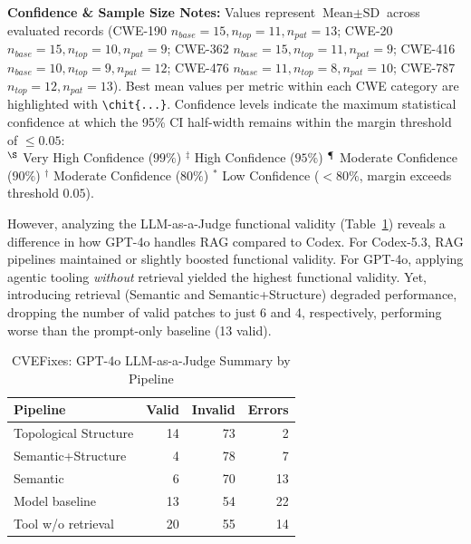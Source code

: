\begin{table}[H]
  \vspace{0.5em}
  \begin{minipage}{\linewidth}
    \small
    \textbf{Confidence \& Sample Size Notes:} Values represent $\text{Mean} \pm \text{SD}$ across evaluated records (CWE-190 $n_{base}=15, n_{top}=11, n_{pat}=13$; CWE-20 $n_{base}=15, n_{top}=10, n_{pat}=9$; CWE-362 $n_{base}=15, n_{top}=11, n_{pat}=9$; CWE-416 $n_{base}=10, n_{top}=9, n_{pat}=12$; CWE-476 $n_{base}=11, n_{top}=8, n_{pat}=10$; CWE-787 $n_{top}=12, n_{pat}=13$). Best mean values per metric within each CWE category are highlighted with \texttt{\textbackslash chit\{...\}}. Confidence levels indicate the maximum statistical confidence at which the 95\% CI half-width remains within the margin threshold of $\le 0.05$: \\
    \quad $^{\S}$ Very High Confidence ($99\%$) \quad $^{\ddagger}$ High Confidence ($95\%$) \quad $^{\mathparagraph}$ Moderate Confidence ($90\%$) \quad $^\dagger$ Moderate Confidence ($80\%$) \quad $^*$ Low Confidence ($<80\%$, margin exceeds threshold $0.05$).
  \end{minipage}
\end{table}

However, analyzing the LLM-as-a-Judge functional validity (Table~\ref{tab:llmjudge_gpt4o}) reveals a difference in how GPT-4o handles RAG compared to Codex. For Codex-5.3, RAG pipelines maintained or slightly boosted functional validity. For GPT-4o, applying agentic tooling \textit{without} retrieval yielded the highest functional validity. Yet, introducing retrieval (Semantic and Semantic+Structure) degraded performance, dropping the number of valid patches to just 6 and 4, respectively, performing worse than the prompt-only baseline (13 valid).

\begin{table}[H]
  \centering
  \caption{CVEFixes: GPT-4o LLM-as-a-Judge Summary by Pipeline}
  \label{tab:llmjudge_gpt4o}
  \begin{tabular}{lrrr}
    \toprule
    \textbf{Pipeline} & \textbf{Valid} & \textbf{Invalid} & \textbf{Errors} \\
    \midrule
    Topological Structure & 14 & 73 & 2 \\
    Semantic+Structure & 4 & 78 & 7 \\
    Semantic  & 6 & 70 & 13 \\
    Model baseline & 13 & 54 & 22 \\
    Tool w/o retrieval& 20 & 55 & 14 \\
    \bottomrule
  \end{tabular}
\end{table}


